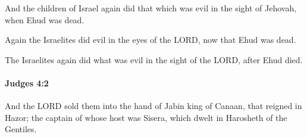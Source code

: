 			\begin{versebox}
					\item[BHS] 
					\item[ASV] And the children of Israel again did that which was evil in the sight of Jehovah, when Ehud was dead.
					\item[NIV] Again the Israelites did evil in the eyes of the LORD, now that Ehud was dead.
					\item[NRSV] The Israelites again did what was evil in the sight of the LORD, after Ehud died.
			\end{versebox}

		\paragraph{Judges 4:2} %
			\label{JUDGES-4-2}

			And the LORD sold them into the hand of Jabin king of Canaan, that reigned in Hazor; the captain of whose host was Sisera, which dwelt in Harosheth of the Gentiles.

